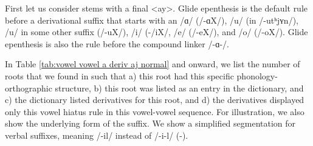 {	
	First let us consider stems with a final <ay>. Glide epenthesis is the default rule before a derivational suffix that starts with an /ɑ/ (/-ɑX/), /u/ (in /-utʰjʏn/), /u/ in some other suffix (/-uX/), /i/ (-/iX/, /e/ (/-eX/), and /o/ (/-oX/). Glide epenthesis is also the rule before the compound linker /-ɑ-/. 
	
	
	
	In Table \ref{tab:vowel vowel a deriv aj normal} and onward,  we  list the number of roots that we found  in \citeauthor{kouyoumdjian-1970-DictionaryArmenianEnglish} such that a) this root had this specific phonology-orthographic structure, b) this root was listed as an entry in the dictionary, and c) the dictionary listed derivatives for this root, and d) the derivatives displayed only this vowel hiatus rule in this vowel-vowel sequence.  For illustration, we also show the underlying form of the suffix. We show a simplified segmentation for verbal suffixes, meaning /-il/ instead of /-i-l/ ({\thgloss}-{\infgloss}). 
	
}
